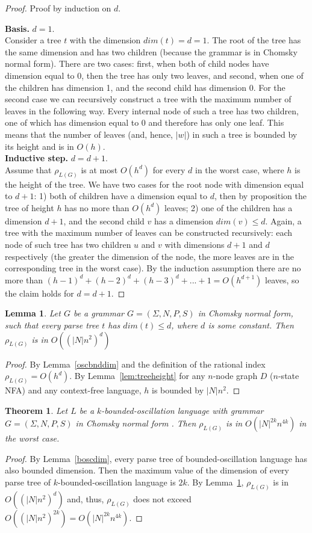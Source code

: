 \documentclass[11pt,a4paper]{article} %
\newtheorem{lemma}{Lemma}
\newtheorem{theorem}{Theorem}
\begin{document}
\begin{proof}
Proof by induction on $d$.

\textbf{Basis.} $d = 1$.
\\
Consider a tree $t$ with the dimension $dim(t) =d= 1$. The root of the tree has the same dimension and has two children (because the grammar is in Chomsky normal form). There are two cases:  first, when both of child nodes have dimension equal to 0, then the tree has only two leaves, and second, when one of the children has dimension 1, and the second child has dimension 0. For the second case we can recursively construct a tree with the maximum number of leaves in the following way. Every internal node of such a tree has two children, one of which has dimension equal to 0 and therefore has only one leaf. This means that the number of leaves (and, hence, $|w|$) in such a tree is bounded by its height and is in $O(h)$. 
\\
\textbf{Inductive step.} $d = d + 1$.
\\
Assume that $\rho_{L(G)}$ is at most $O(h^{d})$ for every $d$ in the worst case, where $h$ is the height of the tree. We have two cases for the root node with dimension equal to $d+1$: 1) both of children have a dimension equal to $d$, then by proposition the tree of height $h$ has no more than $O(h^{d})$ leaves; 2) one of the children has a dimension $d + 1$, and the second child $v$ has a dimension $dim(v) \le d$. Again, a tree with the maximum number of leaves can be constructed recursively:  each node of such tree has two children $u$ and $v$ with dimensions $d+1$ and $d$ respectively (the greater the dimension of the node, the more leaves are in the corresponding tree in the worst case). By the induction assumption there are no more than $(h-1)^d + (h-2)^d + (h-3)^d + ... + 1 = O(h^{d+1})$ leaves, so the claim holds for $d = d+1$.
\end{proof}
\begin{lemma}
\label{finaldim}
Let $G$ be a grammar $G = (\Sigma, N, P, S)$ in Chomsky normal form, such that every parse tree $t$ has $dim(t) \le d$, where $d$ is some constant. Then $\rho_{L(G)}$ is in $O({(|N|n^2)}^{d})$
\end{lemma}
\begin{proof}
By Lemma~\ref{oscbnddim} and the definition of the rational index $\rho_{L(G)} = O(h^d)$. By Lemma~\ref{lem:treeheight} for any $n$-node graph $D$ ($n$-state NFA) and any context-free language, $h$ is bounded by $|N|n^2$. 
\end{proof}
\begin{theorem}
\label{oscbndosc}
Let $L$ be a $k$-bounded-oscillation language with grammar $G = (\Sigma, N, P, S)$ in Chomsky normal form . Then $\rho_{L(G)}$ is in $O({|N|}^{2k}n^{4k})$ in the worst case.
\end{theorem}
\begin{proof}
By Lemma~\ref{boscdim}, every parse tree of bounded-oscillation language has also bounded dimension. Then the maximum value of the dimension of every parse tree of $k$-bounded-oscillation language is $2k$. By Lemma~\ref{finaldim}, $\rho_{L(G)}$ is in $O({(|N|n^2)}^d)$ and, thus, $\rho_{L(G)}$ does not exceed $O({(|N|n^2)}^{2k}) = O({|N|}^{2k}n^{4k})$.
\end{proof}
\end{document}
